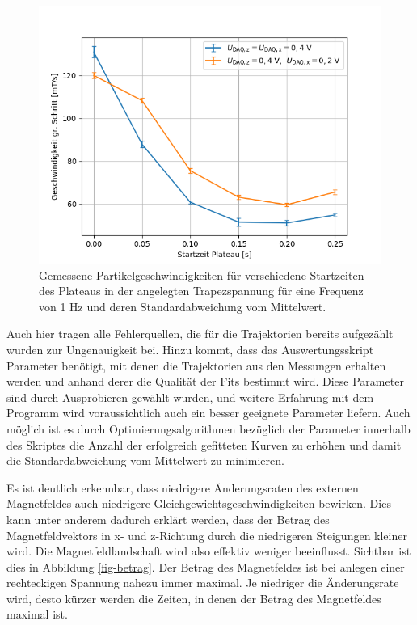\documentclass[page,pdftex,12pt,a4paper,twoside,openright]{scrbook}
\begin{document}
\begin{figure}[!h]
\centering
\includegraphics[width=.75\textwidth]{./img/v.png}
\caption{\label{fig-img_v}
Gemessene Partikelgeschwindigkeiten für verschiedene Startzeiten des Plateaus in der angelegten Trapezspannung für eine Frequenz von 1 Hz und deren Standardabweichung vom Mittelwert.}
\end{figure}

Auch hier tragen alle Fehlerquellen, die für die Trajektorien bereits aufgezählt wurden zur Ungenauigkeit bei. Hinzu kommt, dass das Auswertungsskript Parameter benötigt, mit denen die Trajektorien aus den Messungen erhalten werden und anhand derer die Qualität der Fits bestimmt wird. Diese Parameter sind durch Ausprobieren gewählt wurden, und weitere Erfahrung mit dem Programm wird voraussichtlich auch ein besser geeignete Parameter liefern. Auch möglich ist es durch Optimierungsalgorithmen bezüglich der Parameter innerhalb des Skriptes die Anzahl der erfolgreich gefitteten Kurven zu erhöhen und damit die Standardabweichung vom Mittelwert zu minimieren.

Es ist deutlich erkennbar, dass niedrigere Änderungsraten des externen Magnetfeldes auch niedrigere Gleichgewichtsgeschwindigkeiten bewirken. Dies kann unter anderem dadurch erklärt werden, dass der Betrag des Magnetfeldvektors in x- und z-Richtung durch die niedrigeren Steigungen kleiner wird. Die Magnetfeldlandschaft wird also effektiv weniger beeinflusst. Sichtbar ist dies in Abbildung \ref{fig-betrag}. Der Betrag des Magnetfeldes ist bei anlegen einer rechteckigen Spannung nahezu immer maximal. Je niedriger die Änderungsrate wird, desto kürzer werden die Zeiten, in denen der Betrag des Magnetfeldes maximal ist.
\end{document}
